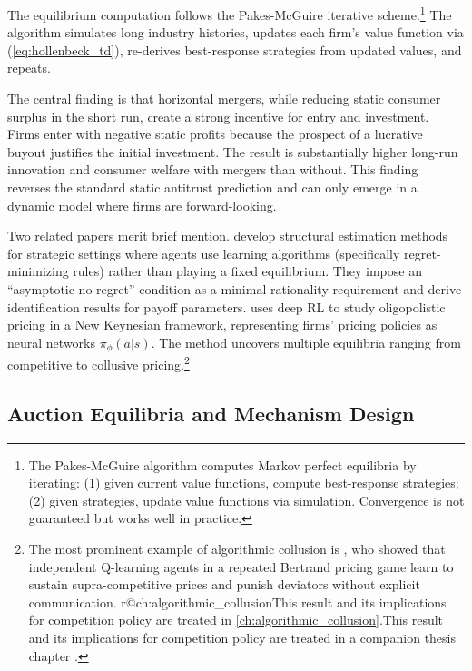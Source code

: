 The equilibrium computation follows the Pakes-McGuire iterative scheme.\footnote{The Pakes-McGuire algorithm \citep{PakesMcGuire1994} computes Markov perfect equilibria by iterating: (1) given current value functions, compute best-response strategies; (2) given strategies, update value functions via simulation. Convergence is not guaranteed but works well in practice.} The algorithm simulates long industry histories, updates each firm's value function via (\ref{eq:hollenbeck_td}), re-derives best-response strategies from updated values, and repeats.

The central finding is that horizontal mergers, while reducing static consumer surplus in the short run, create a strong incentive for entry and investment. Firms enter with negative static profits because the prospect of a lucrative buyout justifies the initial investment. The result is substantially higher long-run innovation and consumer welfare with mergers than without. This finding reverses the standard static antitrust prediction and can only emerge in a dynamic model where firms are forward-looking.

Two related papers merit brief mention. \citet{LomysMagnolfi2024} develop structural estimation methods for strategic settings where agents use learning algorithms (specifically regret-minimizing rules) rather than playing a fixed equilibrium. They impose an ``asymptotic no-regret'' condition as a minimal rationality requirement and derive identification results for payoff parameters. \citet{Covarrubias2022} uses deep RL to study oligopolistic pricing in a New Keynesian framework, representing firms' pricing policies as neural networks $\pi_\phi(a|s)$. The method uncovers multiple equilibria ranging from competitive to collusive pricing.\footnote{The most prominent example of algorithmic collusion is \citet{Calvano2020}, who showed that independent Q-learning agents in a repeated Bertrand pricing game learn to sustain supra-competitive prices and punish deviators without explicit communication. \ifcsname r@ch:algorithmic_collusion\endcsname This result and its implications for competition policy are treated in \cref{ch:algorithmic_collusion}.\else This result and its implications for competition policy are treated in a companion thesis chapter \citep{Rawat2026collusion}.\fi}


\subsection{Auction Equilibria and Mechanism Design}

